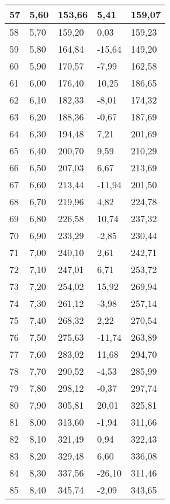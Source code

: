 \documentclass{article}
\begin{document}
\begin{longtable}{|l|l|l|l|l|}
    57 & 5,60 & 153,66 & 5,41 & 159,07 \\ \hline
    58 & 5,70 & 159,20 & 0,03 & 159,23 \\ \hline
    59 & 5,80 & 164,84 & -15,64 & 149,20 \\ \hline
    60 & 5,90 & 170,57 & -7,99 & 162,58 \\ \hline
    61 & 6,00 & 176,40 & 10,25 & 186,65 \\ \hline
    62 & 6,10 & 182,33 & -8,01 & 174,32 \\ \hline
    63 & 6,20 & 188,36 & -0,67 & 187,69 \\ \hline
    64 & 6,30 & 194,48 & 7,21 & 201,69 \\ \hline
    65 & 6,40 & 200,70 & 9,59 & 210,29 \\ \hline
    66 & 6,50 & 207,03 & 6,67 & 213,69 \\ \hline
    67 & 6,60 & 213,44 & -11,94 & 201,50 \\ \hline
    68 & 6,70 & 219,96 & 4,82 & 224,78 \\ \hline
    69 & 6,80 & 226,58 & 10,74 & 237,32 \\ \hline
    70 & 6,90 & 233,29 & -2,85 & 230,44 \\ \hline
    71 & 7,00 & 240,10 & 2,61 & 242,71 \\ \hline
    72 & 7,10 & 247,01 & 6,71 & 253,72 \\ \hline
    73 & 7,20 & 254,02 & 15,92 & 269,94 \\ \hline
    74 & 7,30 & 261,12 & -3,98 & 257,14 \\ \hline
    75 & 7,40 & 268,32 & 2,22 & 270,54 \\ \hline
    76 & 7,50 & 275,63 & -11,74 & 263,89 \\ \hline
    77 & 7,60 & 283,02 & 11,68 & 294,70 \\ \hline
    78 & 7,70 & 290,52 & -4,53 & 285,99 \\ \hline
    79 & 7,80 & 298,12 & -0,37 & 297,74 \\ \hline
    80 & 7,90 & 305,81 & 20,01 & 325,81 \\ \hline
    81 & 8,00 & 313,60 & -1,94 & 311,66 \\ \hline
    82 & 8,10 & 321,49 & 0,94 & 322,43 \\ \hline
    83 & 8,20 & 329,48 & 6,60 & 336,08 \\ \hline
    84 & 8,30 & 337,56 & -26,10 & 311,46 \\ \hline
    85 & 8,40 & 345,74 & -2,09 & 343,65 \\ \hline

\end{longtable}
\end{document}
